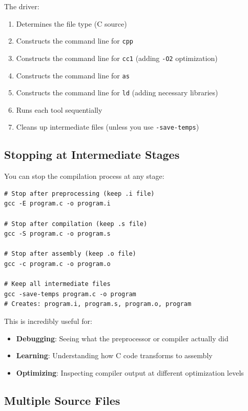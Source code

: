 The driver:
\begin{enumerate}
    \item Determines the file type (C source)
    \item Constructs the command line for \texttt{cpp}
    \item Constructs the command line for \texttt{cc1} (adding \texttt{-O2} optimization)
    \item Constructs the command line for \texttt{as}
    \item Constructs the command line for \texttt{ld} (adding necessary libraries)
    \item Runs each tool sequentially
    \item Cleans up intermediate files (unless you use \texttt{-save-temps})
\end{enumerate}

\subsection{Stopping at Intermediate Stages}

You can stop the compilation process at any stage:

\begin{verbatim}
# Stop after preprocessing (keep .i file)
gcc -E program.c -o program.i

# Stop after compilation (keep .s file)
gcc -S program.c -o program.s

# Stop after assembly (keep .o file)
gcc -c program.c -o program.o

# Keep all intermediate files
gcc -save-temps program.c -o program
# Creates: program.i, program.s, program.o, program
\end{verbatim}

This is incredibly useful for:
\begin{itemize}
    \item \textbf{Debugging}: Seeing what the preprocessor or compiler actually did
    \item \textbf{Learning}: Understanding how C code transforms to assembly
    \item \textbf{Optimizing}: Inspecting compiler output at different optimization levels
\end{itemize}

\subsection{Multiple Source Files}

